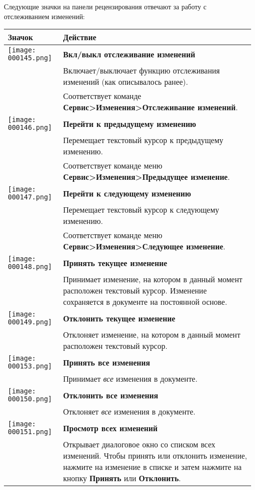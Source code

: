 ﻿\documentclass[a4paper,10pt]{article}
\begin{document}
Следующие значки на панели рецензирования отвечают за работу с отслеживанием изменений:
\begin{center}
\begin{longtable}{  m{2cm}  m{14cm}  }  
 \textbf{Значок} & \textbf{Действие}\\ 
 \hline
  \texttt{[image: 000145.png]} & \textbf{Вкл/выкл отслеживание изменений}\\
   & Включает/выключает функцию отслеживания изменений (как описывалось ранее).\\
   & Соответствует команде \textbf{Сервис>Изменения>Отслеживание изменений}.\\
  \texttt{[image: 000146.png]} & \textbf{Перейти к предыдущему изменению}\\ 
   & Перемещает текстовый курсор к предыдущему изменению.\\
   & Соответствует команде меню \textbf{Сервис>Изменения>Предыдущее изменение}.\\
\texttt{[image: 000147.png]} & \textbf{Перейти к следующему изменению}\\
 & Перемещает текстовый курсор к следующему изменению.\\
 & Соответствует команде меню \textbf{Сервис>Изменения>Следующее изменение}.\\
\texttt{[image: 000148.png]} & \textbf{Принять текущее изменение}\\
 & Принимает изменение, на котором в данный момент расположен текстовый курсор. Изменение сохраняется в документе на постоянной основе.\\
\texttt{[image: 000149.png]} & \textbf{Отклонить текущее изменение}\\
& Отклоняет изменение, на котором в данный момент расположен текстовый курсор.\\
\texttt{[image: 000153.png]} & \textbf{Принять все изменения}\\
 & Принимает \textit{все} изменения в документе.\\
\texttt{[image: 000150.png]} & \textbf{Отклонить все изменения}\\
& Отклоняет \textit{все} изменения в документе.\\
\texttt{[image: 000151.png]} & \textbf{Просмотр всех изменений}\\
& Открывает диалоговое окно со списком всех изменений. Чтобы принять или отклонить изменение, нажмите на изменение в списке и затем нажмите на кнопку \textbf{Принять} или \textbf{Отклонить}.\\

\end{longtable}
\end{center}
\end{document}
